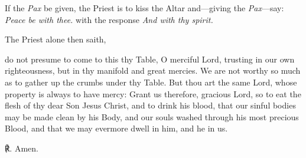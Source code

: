 \begin{rubric}
    If the \emph{Pax} be given, the Priest is to kiss the Altar and---giving the \emph{Pax}---say: \emph{Peace be with thee.} with the response \emph{And with thy spirit.}
\end{rubric}
\begin{rubric}
    The Priest alone then saith,
\end{rubric}
 do not presume to come to this thy Table, O merciful Lord, trusting in our own righteousness, but in thy manifold and great mercies. We are not worthy so much as to gather up the crumbs under thy Table. But thou art the same Lord, whose property is always to have mercy: Grant us therefore, gracious Lord, so to eat the flesh of thy dear Son Jesus Christ, and to drink his blood, that our sinful bodies may be made clean by his Body, and our souls washed through his most precious Blood, and that we may evermore dwell in him, and he in us.\par
℟. Amen.

